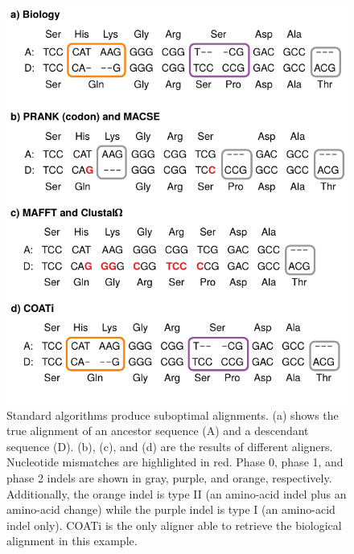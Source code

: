 \documentclass[12pt,letterpaper]{article}
\begin{document}
\begin{figure}[h!]
    \centering%
    \includegraphics[scale=1]{fig-aln.pdf}
    \par
    \caption{
        Standard algorithms produce suboptimal alignments.
        (a) shows the true alignment of an ancestor sequence (A) and a descendant sequence (D).
        (b), (c), and (d) are the results of different aligners.
        Nucleotide mismatches are highlighted in red. Phase 0, phase 1, and phase 2 indels are shown in gray, purple, and orange, respectively.
        Additionally, the orange indel is type II (an amino-acid indel plus an amino-acid change) while the purple indel is type I (an amino-acid indel only).
        COATi is the only aligner able to retrieve the biological alignment in this example.
        }
    \label{fig:aln}
\end{figure}
\end{document}
